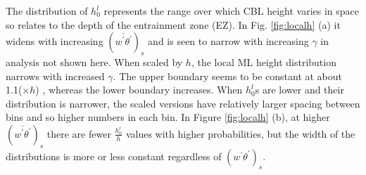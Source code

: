 The distribution of $h_{0}^{l}$ represents the range over which CBL height varies in space so relates to the depth of the entrainment zone (EZ).  In Fig. \ref{fig:localh} (a) it widens with increasing $(\overline{w^{'}\theta^{'}})_{s}$ and is seen to narrow with increasing $\gamma$ in analysis not shown here.  When scaled by $h$, the local ML height distribution narrows with increased $\gamma$.  The upper boundary seems to be constant at about 1.1($\times h$) , whereas the lower boundary increases.  When $h_{0}^{l}$s are lower and their distribution is narrower, the scaled versions have relatively larger spacing between bins and so higher numbers in each bin. In Figure \ref{fig:localh} (b), at higher $(\overline{w^{'}\theta^{'}})_{s}$ there are fewer $\frac{h_{0}^{l}}{h}$ values with higher probabilities, but the width of the distributions is more or less constant regardless of $(w^{'}\theta^{'})_{s}$.\\

